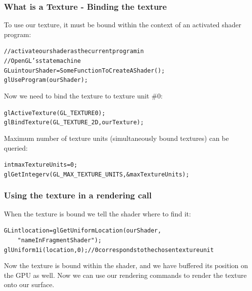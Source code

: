 \documentclass{beamer}
\begin{document}
%
%
%
\begin{frame}
\frametitle{What is a Texture - Binding the texture}
To use our texture, it must be bound within the context of an activated
shader program:

\begin{alltt}\footnotesize
// activate our shader as the current program in\\
// OpenGL's state machine\\
GLuint ourShader = SomeFunctionToCreateAShader();\\
glUseProgram(ourShader);\\
\end{alltt}

Now we need to bind the texture to texture unit \#0:
\begin{alltt}\footnotesize
glActiveTexture(GL\_TEXTURE0);\\
glBindTexture(GL\_TEXTURE\_2D, ourTexture);
\end{alltt}

Maximum number of texture units (simultaneously bound textures) can be queried:
\begin{alltt}\footnotesize
int maxTextureUnits = 0;\\
glGetIntegerv(GL\_MAX\_TEXTURE\_UNITS, \&maxTextureUnits);
\end{alltt}
\end{frame}


%
%
%
\begin{frame}
\frametitle{Using the texture in a rendering call}
When the texture is bound we tell the shader where to find it:
\begin{alltt}\footnotesize
GLint location = glGetUniformLocation(ourShader,\\
\ensuremath{\qquad}"nameInFragmentShader");\\
glUniform1i(location, 0); // 0 corresponds to the chosen texture unit
\end{alltt}

Now the texture is bound within the shader, and we have buffered its
position on the GPU as well. Now we can use our rendering commands to render
the texture onto our surface.
\end{frame}
\end{document}
